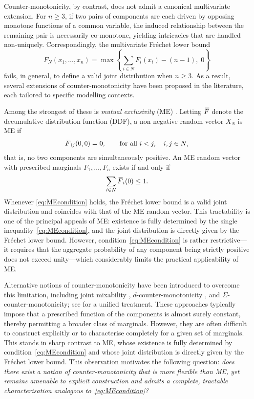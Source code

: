 \documentclass[letterpaper,12pt]{article}
\numberwithin{equation}{section}
\newcommand{\N}{{N}}
\newcommand{\F}{\,\overline{\kern-0.175em F\kern-0em}}
\begin{document}
{Counter-monotonicity, by contrast, does not admit a canonical multivariate
extension. For $n \ge 3$, if two pairs
of components are each driven by opposing monotone functions of a common variable,
the induced relationship between the remaining pair is necessarily co-monotone,
yielding intricacies that are handled non-uniquely. Correspondingly, the multivariate
Fr\'{e}chet lower bound
\[
    F_{\N}(x_1, \dots, x_n)
        = \max\left\{\sum_{i\in\N} F_i(x_i) - (n-1),\; 0\right\}
\]
fails, in general, to define a valid joint distribution when $n \ge 3$. As a
result, several extensions of counter-monotonicity have been proposed in the
literature, each tailored to specific modelling contexts.

Among the strongest of these is \emph{mutual exclusivity} (ME) \citep{Dhaene1999,
Cheung2014}. Letting $\F$ denote the decumulative distribution function (DDF),
a non-negative random vector $X_{\N}$ is ME if
\begin{equation}
    \label{eq:MEdef}
    \F_{ij}(0,0) = 0, \qquad \text{for all } i<j,\quad i,j \in \N,
\end{equation}
that is, no two components are simultaneously positive. An ME random vector with
prescribed marginals $F_1, \dots, F_n$ exists if and only if
\begin{equation}
    \label{eq:MEcondition}
    \sum_{i\in\N}\F_i(0) \le 1.
\end{equation}
Whenever \eqref{eq:MEcondition} holds, the Fr\'{e}chet lower bound is a valid
joint distribution and coincides with that of the ME random vector. This
tractability is one of the principal appeals of ME: existence is fully determined
by the single inequality~\eqref{eq:MEcondition}, and the joint distribution is
directly given by the Fr\'{e}chet lower bound. However,
condition~\eqref{eq:MEcondition} is rather restrictive---it requires that the
aggregate probability of any component being strictly positive does not exceed
unity---which considerably limits the practical applicability of ME.

Alternative notions of counter-monotonicity have been introduced to overcome this
limitation, including joint mixability \citep{Wang2016}, $d$-counter-monotonicity
\citep{Lee2014}, and $\Sigma$-counter-monotonicity; see \cite{Puccetti2015} for a
unified treatment. These approaches typically impose that a prescribed function of
the components is almost surely constant, thereby permitting a broader class of
marginals. However, they are often difficult to construct explicitly or to
characterise completely for a given set of marginals. This stands in sharp
contrast to ME, whose existence is fully determined by condition~\eqref{eq:MEcondition}
and whose joint distribution is directly given by the Fr\'{e}chet lower bound.
This observation motivates the following question: \emph{does there exist a notion
of counter-monotonicity that is more flexible than ME, yet remains amenable to
explicit construction and admits a complete, tractable characterisation analogous
to~\eqref{eq:MEcondition}?}

}
\end{document}
